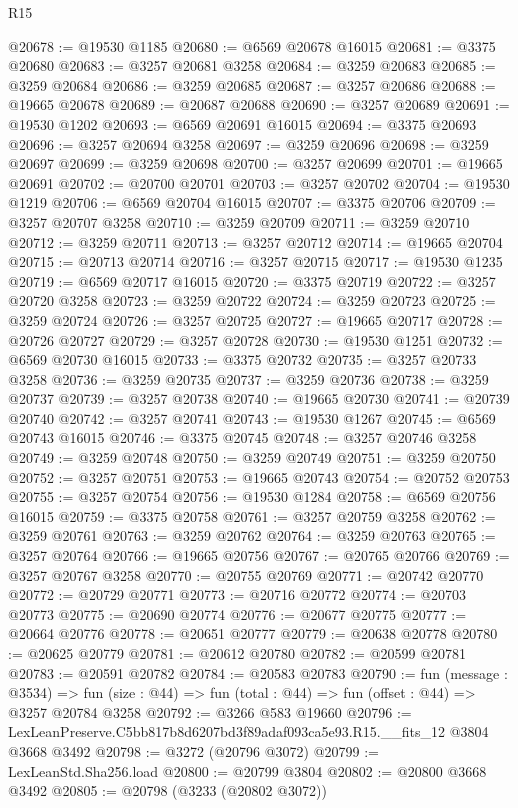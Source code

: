 \begin{lexlean}{R15}
\begin{coremodule}
@20678 := @19530 @1185
@20680 := @6569 @20678 @16015
@20681 := @3375 @20680
@20683 := @3257 @20681 @3258
@20684 := @3259 @20683
@20685 := @3259 @20684
@20686 := @3259 @20685
@20687 := @3257 @20686
@20688 := @19665 @20678
@20689 := @20687 @20688
@20690 := @3257 @20689
@20691 := @19530 @1202
@20693 := @6569 @20691 @16015
@20694 := @3375 @20693
@20696 := @3257 @20694 @3258
@20697 := @3259 @20696
@20698 := @3259 @20697
@20699 := @3259 @20698
@20700 := @3257 @20699
@20701 := @19665 @20691
@20702 := @20700 @20701
@20703 := @3257 @20702
@20704 := @19530 @1219
@20706 := @6569 @20704 @16015
@20707 := @3375 @20706
@20709 := @3257 @20707 @3258
@20710 := @3259 @20709
@20711 := @3259 @20710
@20712 := @3259 @20711
@20713 := @3257 @20712
@20714 := @19665 @20704
@20715 := @20713 @20714
@20716 := @3257 @20715
@20717 := @19530 @1235
@20719 := @6569 @20717 @16015
@20720 := @3375 @20719
@20722 := @3257 @20720 @3258
@20723 := @3259 @20722
@20724 := @3259 @20723
@20725 := @3259 @20724
@20726 := @3257 @20725
@20727 := @19665 @20717
@20728 := @20726 @20727
@20729 := @3257 @20728
@20730 := @19530 @1251
@20732 := @6569 @20730 @16015
@20733 := @3375 @20732
@20735 := @3257 @20733 @3258
@20736 := @3259 @20735
@20737 := @3259 @20736
@20738 := @3259 @20737
@20739 := @3257 @20738
@20740 := @19665 @20730
@20741 := @20739 @20740
@20742 := @3257 @20741
@20743 := @19530 @1267
@20745 := @6569 @20743 @16015
@20746 := @3375 @20745
@20748 := @3257 @20746 @3258
@20749 := @3259 @20748
@20750 := @3259 @20749
@20751 := @3259 @20750
@20752 := @3257 @20751
@20753 := @19665 @20743
@20754 := @20752 @20753
@20755 := @3257 @20754
@20756 := @19530 @1284
@20758 := @6569 @20756 @16015
@20759 := @3375 @20758
@20761 := @3257 @20759 @3258
@20762 := @3259 @20761
@20763 := @3259 @20762
@20764 := @3259 @20763
@20765 := @3257 @20764
@20766 := @19665 @20756
@20767 := @20765 @20766
@20769 := @3257 @20767 @3258
@20770 := @20755 @20769
@20771 := @20742 @20770
@20772 := @20729 @20771
@20773 := @20716 @20772
@20774 := @20703 @20773
@20775 := @20690 @20774
@20776 := @20677 @20775
@20777 := @20664 @20776
@20778 := @20651 @20777
@20779 := @20638 @20778
@20780 := @20625 @20779
@20781 := @20612 @20780
@20782 := @20599 @20781
@20783 := @20591 @20782
@20784 := @20583 @20783
@20790 := fun (message : @3534) =>
  fun (size : @44) => fun (total : @44) => fun (offset : @44) => @3257 @20784 @3258
@20792 := @3266 @583 @19660
@20796 := LexLeanPreserve.C5bb817b8d6207bd3f89adaf093ca5e93.R15.__fits_12 @3804 @3668 @3492
@20798 := @3272 (@20796 @3072)
@20799 := LexLeanStd.Sha256.load
@20800 := @20799 @3804
@20802 := @20800 @3668 @3492
@20805 := @20798 (@3233 (@20802 @3072))

\end{coremodule}
\end{lexlean}

